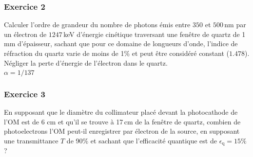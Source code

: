 \subsubsection{Exercice 2}
Calculer l'ordre de grandeur du nombre de photons émis entre $350$ et $500$\,nm par un électron de $1247$\,keV d'énergie cinétique traversant une fenêtre de quartz de 1\,mm d'épaisseur, sachant que pour ce domaine de longueurs d’onde, l'indice de réfraction du quartz varie de moins de 1\% et peut être considéré constant ($1.478$). Négliger la perte d'énergie de l'électron dans le quartz.\\ $\alpha = 1/137$


\subsubsection{Exercice 3}
En supposant que le diamètre du collimateur placé devant la photocathode de l'OM est de 6 cm et qu'il se trouve à 17\,cm de la fenêtre de quartz, combien de photoelectrons l'OM peut-il enregistrer par électron de la source, en supposant une transmittance $T$ de 90\% et sachant que l'efficacité quantique est de $\epsilon_\mathrm{q}=15\%$?


